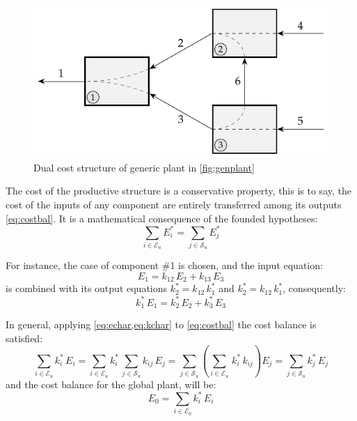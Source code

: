 \documentclass[energies,article,submit,moreauthors,pdftex]{Definitions/mdpi}
\begin{document}
\begin{figure}[ht]
    \centering
    \includegraphics{genplantr}
    \caption{Dual cost structure of generic plant in \cref{fig:genplant}}
    \label{fig:genplantr}
\end{figure}

The cost of the productive structure is a conservative property, this is to say, the cost of the inputs of any component are entirely transferred among its outputs \cref{eq:costbal}. It is a mathematical consequence of the founded hypotheses:
\begin{equation}
    \sum_{i\in\mathcal{E}_u}{E_i^*}=\sum_{j\in\mathcal{S}_u}{E_j^*}
    \label{eq:costbal}
\end{equation}

For instance, the case of component \#1 is chosen, and the input equation:
\[
E_1=k_{12}\,E_2+k_{13}\,E_3
\]
is combined with its output equations $k_2^*=k_{12}\,k_1^*$ and $k_2^*=k_{12}\,k_1^*$, consequently:
\[
 k_1^*\,E_1 = k_2^*\,E_2+k_3^*\,E_3
\]

In general, applying \cref{eq:echar,eq:kchar} to \cref{eq:costbal} the cost balance is satisfied:
\begin{equation}
    \sum_{i\in\mathcal{E}_u}{k_i^*\,E_i}=\sum_{i\in\mathcal{E}_u}{k_i^*\,\sum_{j\in\mathcal{S}_u}{k_{ij}\,E_j}}=\sum_{j\in\mathcal{S}_u}{\left(\sum_{i\in\mathcal{E}_u}\,k_i^*\,k_{ij}\right)E_j}=\sum_{j\in\mathcal{S}_u}{k_j^*\,E_j}
\end{equation}
and the cost balance for the global plant, will be:
\begin{equation}
    E_0=\sum_{i\in\mathcal{E}_0}{k_i^*\,E_i}
\end{equation}
\end{document}
